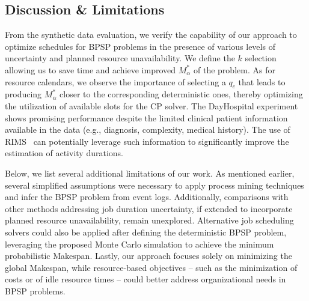 \subsection{Discussion \& Limitations}

From the synthetic data evaluation, we verify the capability of our approach to optimize schedules for BPSP problems in the presence of various levels of uncertainty and planned resource unavailability. We define the $k$ selection allowing us to save time and achieve 
improved $M^*_\alpha$ of the problem. As for resource calendars, we observe the importance of selecting a $q_c$ that leads to producing $M^*_\alpha$  closer to the corresponding deterministic ones, thereby optimizing the utilization of available slots for the CP solver.
The DayHospital experiment shows promising performance despite
the limited clinical patient information available in the data (e.g., diagnosis, complexity, medical history). 
The use of RIMS~\cite{MeneghelloFGR25} can potentially leverage
such information to significantly improve the
estimation of activity durations.


Below, we list several additional limitations of our work. As mentioned earlier, several simplified assumptions were necessary to apply process mining techniques and infer the BPSP problem from event logs. Additionally, comparisons with other methods addressing job duration uncertainty, if extended to incorporate planned resource unavailability, remain unexplored. Alternative job scheduling solvers could also be applied after defining the deterministic BPSP problem, leveraging the proposed Monte Carlo simulation to achieve the minimum probabilistic Makespan. Lastly, our approach focuses solely on minimizing the global Makespan, while resource-based objectives -- such as the minimization of costs or of idle resource times -- could better address organizational needs in BPSP problems.